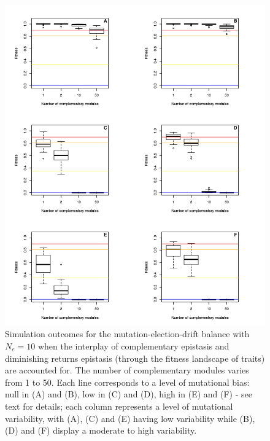 \begin{figure}[h!]
    \centering
    \includegraphics[scale=0.75,trim=0cm 0cm 0cm 0cm,clip]{pics/Epistasis/Evo_Outcomes_Ne10.jpeg}
    \caption{Simulation outcomes for the mutation-election-drift balance with $N_e=10$ when the interplay of complementary epistasis and diminishing returns epistasis (through the fitness landscape of traits) are accounted for. The number of complementary modules varies from 1 to 50. Each line corresponds to a level of mutational bias: null in (A) and (B), low in (C) and (D), high in (E) and (F) - see text for details; each column represents a level of mutational variability, with (A), (C) and (E) having low variability while (B), (D) and (F) display a moderate to high variability.}
    \label{fig:Outcomes10}
\end{figure}

%

